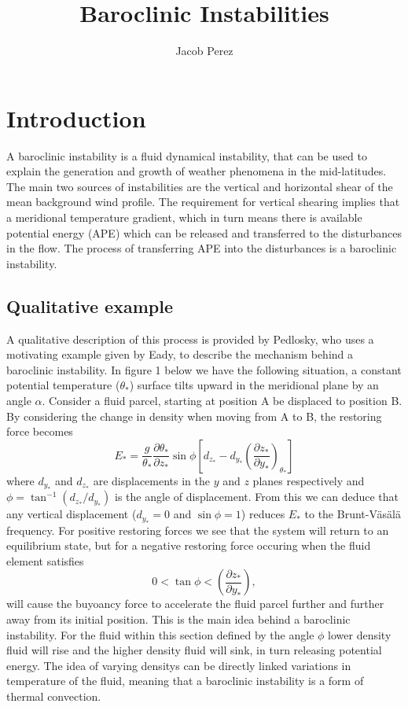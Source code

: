 \documentclass{article}
\title{Baroclinic Instabilities}
\author{Jacob Perez}
\begin{document}
 
\maketitle
\tableofcontents 
\section{Introduction} 

A baroclinic instability is a fluid dynamical instability, that can be used to explain the generation and growth of weather phenomena in the mid-latitudes. The main two sources of instabilities are the vertical and horizontal shear of the mean background wind profile. The requirement for vertical shearing implies that a meridional temperature gradient, which in turn means there is available potential energy (APE) which can be released and transferred to the disturbances in the flow. The process of transferring APE into the disturbances is a baroclinic instability.  
\subsection{Qualitative example} 
A qualitative description of this process is provided by Pedlosky, who uses a motivating example given by Eady, to describe the mechanism behind a baroclinic instability.  In figure 1 below we have the following situation, a constant potential temperature ($\theta_*$) surface tilts upward in the meridional plane by an angle $\alpha$. Consider a fluid parcel, starting at position A be displaced to position B. By considering the change in density when moving from A to B, the restoring force becomes  
\begin{equation}
  E_* = \frac{g}{\theta_*}\frac{\partial\theta_*}{\partial z_*}\sin\phi\left[d_{z_*}-d_{y_*}\left(\frac{\partial z_*}{\partial y_*}\right)_{\theta_*}\right]
\end{equation}
where $d_{y_*}$ and $d_{z_*}$ are displacements in the $y$ and $z$ planes respectively and $\phi=\tan^{-1}(d_{z_*}/d_{y_*})$ is the angle of displacement. From this we can deduce that any vertical displacement ($d_{y_*}=0$ and $\sin\phi = 1$) reduces $E_*$ to the Brunt-V\"as\"al\"a frequency. For positive restoring forces we see that the system will return to an equilibrium state, but for a negative restoring force occuring when the fluid element satisfies
\begin{equation}
  0 < \tan\phi < \left(\frac{\partial z_*}{\partial y_*}\right),
\end{equation}
will cause the buyoancy force to accelerate the fluid parcel further and further away from its initial position. This is the main idea behind a baroclinic instability. For the fluid within this section defined by the angle $\phi$ lower density fluid will rise and the higher density fluid will sink, in turn releasing potential energy. The idea of varying densitys can be directly linked variations in temperature of the fluid, meaning that a baroclinic instability is a form of thermal convection. 
\end{document}
